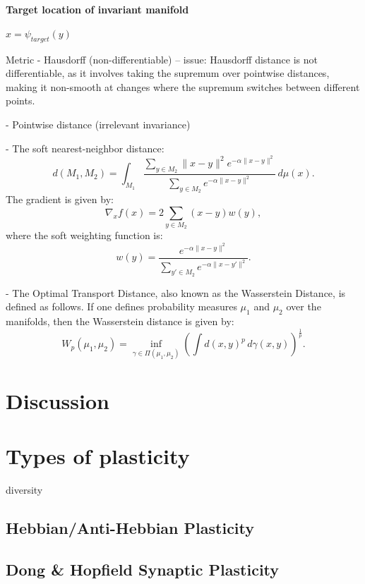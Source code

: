 \documentclass{article}
\theoremstyle{definition} \newtheorem{definition}{Definition}
\theoremstyle{remark} \newtheorem{remark}{Remark}
\newcounter{ct}
\begin{document}
\paragraph{Target location of invariant manifold}
$x = \psi_{target}(y)$

Metric
- Hausdorff (non-differentiable)
-- issue: Hausdorff distance is not differentiable, as it involves taking the supremum over pointwise distances, making it non-smooth at changes where the supremum switches between different points.


- Pointwise distance (irrelevant invariance)

- The soft nearest-neighbor distance:
\[
d(M_1, M_2) = \int_{M_1} \frac{\sum\limits_{y \in M_2} \|x - y\|^2 e^{-\alpha \|x - y\|^2}}{\sum\limits_{y \in M_2} e^{-\alpha \|x - y\|^2}} \, d\mu(x).
\]
The gradient is given by:
\[
\nabla_x f(x) = 2 \sum_{y \in M_2} (x - y) w(y),
\]
where the soft weighting function is:
\[
w(y) = \frac{e^{-\alpha \|x - y\|^2}}{\sum\limits_{y' \in M_2} e^{-\alpha \|x - y'\|^2}}.
\]


- The Optimal Transport Distance, also known as the Wasserstein Distance, is defined as follows.
If one defines probability measures \( \mu_1 \) and \( \mu_2 \) over the manifolds, then the Wasserstein distance is given by:
\[
W_p(\mu_1, \mu_2) = \inf_{\gamma \in \Pi(\mu_1, \mu_2)} \left( \int d(x, y)^p \, d\gamma(x, y) \right)^{\frac{1}{p}}.
\]





\section{Discussion}




\newpage
%




\newpage
\appendix

\section{Types of plasticity}
diversity\citep{zenke2015diverse}

\subsection{Hebbian/Anti-Hebbian Plasticity}
\subsection{Dong \& Hopfield Synaptic Plasticity}
\end{document}
